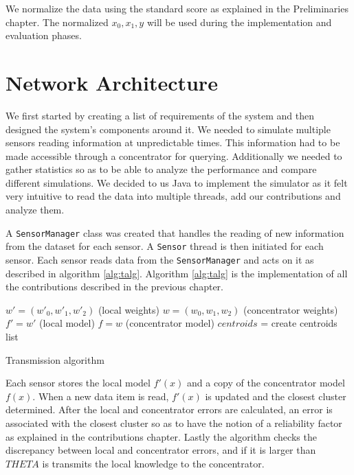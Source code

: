\documentclass{mproj}
\begin{document}
We normalize the data using the standard score as explained in the Preliminaries chapter. The normalized $x_0,x_1,y$ will be used during the implementation and evaluation phases.

\section{Network Architecture}
We first started by creating a list of requirements of the system and then designed the system's components around it. We needed to simulate multiple sensors reading information at unpredictable times. This information had to be made accessible through a concentrator for querying. Additionally we needed to gather statistics so as to be able to analyze the performance and compare different simulations. We decided to us Java to implement the simulator as it felt very intuitive to read the data into multiple threads, add our contributions and analyze them.

A \texttt{SensorManager} class was created that handles the reading of new information from the dataset for each sensor. A \texttt{Sensor} thread is then initiated for each sensor. Each sensor reads data from the \texttt{SensorManager} and acts on it as described in algorithm \ref{alg:talg}. Algorithm \ref{alg:talg} is the implementation of all the contributions described in the previous chapter. 

\begin{algorithm}[H]
$w'=(w'_0,w'_1,w'_2)$ (local weights)\;
$w=(w_0,w_1,w_2)$ (concentrator weights)\;
$f' = w'$ (local model)\;
$f = w$ (concentrator model)\;
$centroids$ = create centroids list\;
 \caption{Transmission algorithm}
 \label{alg:talg}
\end{algorithm}

Each sensor stores the local model $f'(x)$ and a copy of the concentrator model $f(x)$. When a new data item is read, $f'(x)$ is updated and the closest cluster determined. After the local and concentrator errors are calculated, an error is associated with the closest cluster so as to have the notion of a reliability factor as explained in the contributions chapter. Lastly the algorithm checks the discrepancy between local and concentrator errors, and if it is larger than $THETA$ is transmits the local knowledge to the concentrator.
\end{document}
